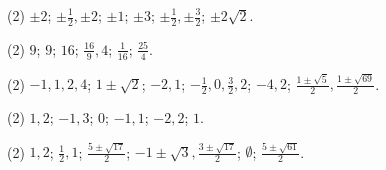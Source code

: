 \documentclass[11pt,a4paper]{scrartcl}
\begin{document}
\newpage
\answerssection

\begin{problem} \phantom{text}
\begin{tasks}[label={(\arabic*)}, label-offset=0.9em](2)
    \task \(\pm 2\);
    \task \(\pm \frac{1}{2}, \pm 2\);
    \task \(\pm 1\);
    \task \(\pm 3\);
    \task \(\pm \frac{1}{2}, \pm \frac{3}{2}\);
    \task \(\pm 2\sqrt{2}\).
\end{tasks}
\end{problem}

\begin{problem} \phantom{text}
\begin{tasks}[label={(\arabic*)}, label-offset=0.9em](2)
    \task $9$;
    \task $9$;
    \task $16$;
    \task \(\frac{16}{9}, 4\);
    \task \(\frac{1}{16}\);
    \task \(\frac{25}{4}\).
\end{tasks}
\end{problem}

\begin{problem} \phantom{text}
\begin{tasks}[label={(\arabic*)}, label-offset=0.9em](2)
    \task \(-1, 1, 2, 4\);
    \task \(1 \pm \sqrt{2}\);
    \task \(-2, 1\);
    \task \(-\frac{1}{2}, 0, \frac{3}{2}, 2\);
    \task \(-4, 2\);
    \task \(\frac{1 \pm \sqrt{5}}{2}, \frac{1 \pm \sqrt{69}}{2}\).
\end{tasks}
\end{problem}

\begin{problem} \phantom{text}
\begin{tasks}[label={(\arabic*)}, label-offset=0.9em](2)
    \task $1, 2$;
    \task \(-1, 3\);
    \task $0$;
    \task \(-1, 1\);
    \task \(-2, 2\);
    \task $1$.
\end{tasks}
\end{problem}

\begin{problem} \phantom{text}
\begin{tasks}[label={(\arabic*)}, label-offset=0.9em](2)
    \task $1, 2$;
    \task \(\frac{1}{2}, 1\);
    \task \(\frac{5 \pm \sqrt{17}}{2}\);
    \task \(-1 \pm \sqrt{3}, \frac{3 \pm \sqrt{17}}{2}\);
    \task \(\emptyset\);
    \task \(\frac{5 \pm \sqrt{61}}{2}\).
\end{tasks}
\end{problem}
\end{document}
